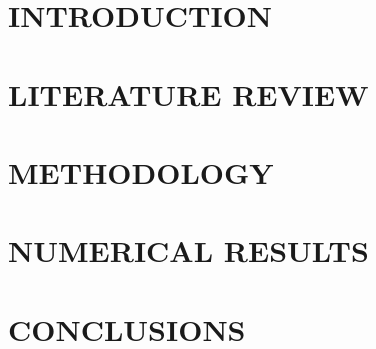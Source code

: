 \documentclass[a4paper,13pt,3p,twoside]{report}
\theoremstyle{definition}
\begin{document}
\renewcommand{\listtablename}{LIST OF TABLES}
{\let\oldnumberline\numberline
\renewcommand{\numberline}{Table~\oldnumberline}
\listoftables}

\glsaddall 
\renewcommand*{\acronymname}{LIST OF ABBREVIATIONS}
\renewcommand*{\entryname}{Abbreviation}
\renewcommand*{\descriptionname}{Definition}
\printnoidxglossaries

\renewcommand\appendixname{APPENDIX}
\renewcommand\appendixpagename{APPENDIX}
\renewcommand\appendixtocname{APPENDIX}

\renewcommand{\figurename}{Figure}
\renewcommand{\tablename}{Table}
\renewcommand{\chaptername}{CHAPTER}



\newpage
{}

\pagestyle{fancy}
\fancyhf{}
\fancyhead[RE, LO]{\leftmark}
\fancyfoot[RE, LO]{\thepage}



\chapter{INTRODUCTION}

\newpage
\chapter{LITERATURE REVIEW}



\newpage
\chapter{METHODOLOGY}


\newpage
\chapter{NUMERICAL RESULTS}


\newpage
\chapter{CONCLUSIONS}

\end{document}
